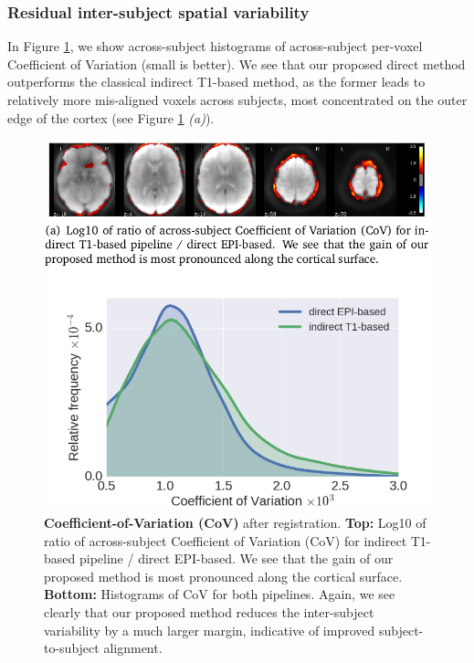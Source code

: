\subsubsection{Residual inter-subject spatial variability}
In Figure \ref{fig:cv}, we show across-subject histograms of
across-subject per-voxel Coefficient of Variation (small is better).
We see that our proposed direct method outperforms the classical indirect T1-based method, as the former leads to relatively more mis-aligned voxels across subjects, most concentrated on the outer edge of the cortex (see Figure \ref{fig:cv} \textit{(a)}).

\begin{figure}[!htb]
\includegraphics[width=1\linewidth]{figures/cov.png}
 
             
\caption{\textbf{Coefficient-of-Variation (CoV)} after registration. \textbf{Top:} Log10 of ratio of across-subject Coefficient of Variation (CoV) for indirect T1-based pipeline / direct EPI-based. We see that the gain of our proposed method is most pronounced along the cortical surface.
\textbf{Bottom:} Histograms of CoV  for both
  pipelines. Again, we see clearly that our proposed method reduces the inter-subject variability by a much larger margin, indicative of improved subject-to-subject alignment.}
\label{fig:cv}
\end{figure}


